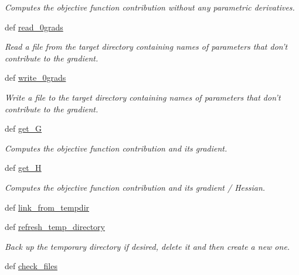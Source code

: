 \begin{DoxyCompactItemize}
\begin{DoxyCompactList}\small\item\em Computes the objective function contribution without any parametric derivatives. \end{DoxyCompactList}\item 
def \hyperlink{classforcebalance_1_1target_1_1Target_a09bb0e8350a17974c908a9728b2709bf}{read\-\_\-0grads}
\begin{DoxyCompactList}\small\item\em Read a file from the target directory containing names of parameters that don't contribute to the gradient. \end{DoxyCompactList}\item 
def \hyperlink{classforcebalance_1_1target_1_1Target_acc7601caa4b719bf7e31961c2eb30dd7}{write\-\_\-0grads}
\begin{DoxyCompactList}\small\item\em Write a file to the target directory containing names of parameters that don't contribute to the gradient. \end{DoxyCompactList}\item 
def \hyperlink{classforcebalance_1_1target_1_1Target_afa8cc38c8bba8861c072e789717aa049}{get\-\_\-\-G}
\begin{DoxyCompactList}\small\item\em Computes the objective function contribution and its gradient. \end{DoxyCompactList}\item 
def \hyperlink{classforcebalance_1_1target_1_1Target_a1d2ee27fe86a09769c1816af23b09adb}{get\-\_\-\-H}
\begin{DoxyCompactList}\small\item\em Computes the objective function contribution and its gradient / Hessian. \end{DoxyCompactList}\item 
def \hyperlink{classforcebalance_1_1target_1_1Target_a5aa4958cea0a48138511567a076c5a82}{link\-\_\-from\-\_\-tempdir}
\item 
def \hyperlink{classforcebalance_1_1target_1_1Target_afe815eafab06ac92f10bbf4b88ad95c8}{refresh\-\_\-temp\-\_\-directory}
\begin{DoxyCompactList}\small\item\em Back up the temporary directory if desired, delete it and then create a new one. \end{DoxyCompactList}\item 
def \hyperlink{classforcebalance_1_1target_1_1Target_ac790529c5f85f0547fe3601ad1cf2419}{check\-\_\-files}

\end{DoxyCompactItemize}
